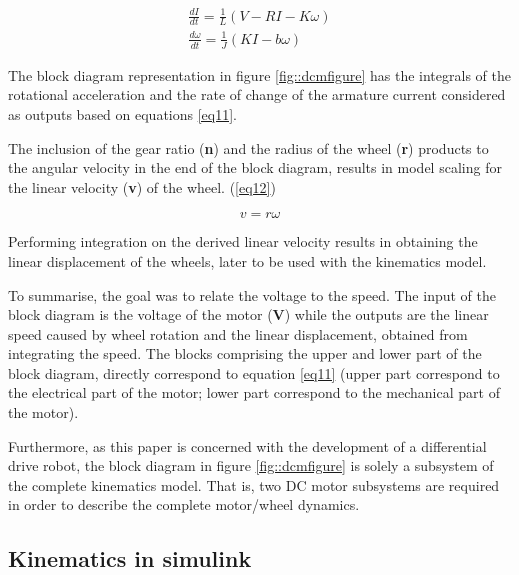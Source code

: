 \begin{align}
\frac{dI}{dt} = \frac{1}{L}(V - RI - K\omega)\label{eq11} \\
\frac{d\omega}{dt} = \frac{1}{J}(KI - b\omega) \nonumber
\end{align}

The block diagram representation in figure \ref{fig::dcmfigure} has the integrals of the rotational acceleration and the rate of change of the armature current considered as outputs based on equations \ref{eq11}.


The inclusion of the gear ratio (\textbf{n}) and the radius of the wheel (\textbf{r}) products to the angular velocity in the end of the block diagram, results in model scaling for the linear velocity (\textbf{v}) of the wheel. (\ref{eq12})

\begin{equation} \label{eq12}
v = r\omega
\end{equation}

Performing integration on the derived linear velocity results in obtaining the linear displacement of the wheels, later to be used with the kinematics model. 

To summarise, the goal was to relate the voltage to the speed. The input of the block diagram is the voltage of the motor (\textbf{V}) while the outputs are the linear speed caused by wheel rotation and the linear displacement, obtained from integrating the speed. The blocks comprising the upper and lower part of the block diagram, directly correspond to equation \ref{eq11} (upper part correspond to the electrical part of the motor; lower part correspond to the mechanical part of the motor).

Furthermore, as this paper is concerned with the development of a differential drive robot, the block diagram in figure \ref{fig::dcmfigure} is solely a subsystem of the complete kinematics model. That is, two DC motor subsystems are required in order to describe the complete motor/wheel dynamics. 


\subsection{Kinematics in simulink} 

